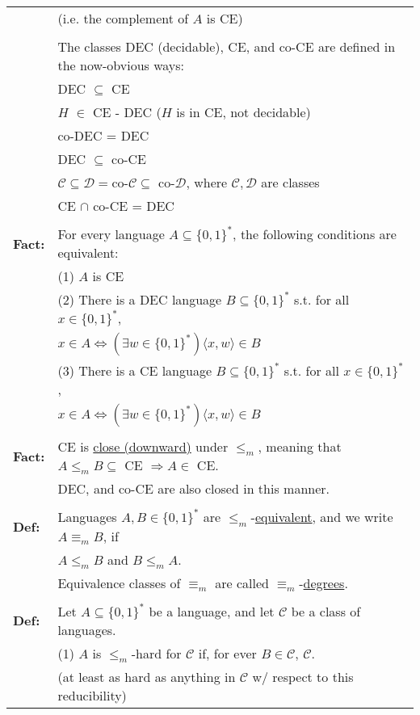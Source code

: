 \documentclass[11pt]{article}
\begin{document}
\begin{longtable}{ll}
& (i.e. the complement of $A$ is CE) \\
\\
& The classes DEC (decidable), CE, and co-CE are defined in the now-obvious ways: \\
& DEC $\subseteq$ CE \\
& $H$ $\in$ CE - DEC ($H$ is in CE, not decidable) \\
& co-DEC = DEC \\
& DEC $\subseteq$ co-CE \\
& $\mathcal{C} \subseteq \mathcal{D} = $co-$\mathcal{C} \subseteq$ co-$\mathcal{D}$, where $\mathcal{C},\mathcal{D}$ are classes \\
& CE $\cap$ co-CE = DEC \\
\\
{\bf Fact:} & For every language $A\subseteq\{0,1\}^*$, the following conditions are equivalent: \\
& (1) $A$ is CE \\
& (2) There is a DEC language $B\subseteq\{0,1\}^*$ s.t. for all $x\in\{0,1\}^*$, \\
& $x\in A \Leftrightarrow (\exists w \in \{0,1\}^*)\langle x,w \rangle \in B$ \\
& (3) There is a CE language $B\subseteq\{0,1\}^*$ s.t. for all $x\in\{0,1\}^*$, \\
& $x\in A \Leftrightarrow (\exists w \in \{0,1\}^*)\langle x,w \rangle \in B$ \\
\\
{\bf Fact:} & CE is \underline{close (downward)} under $\leqslant_m$, meaning that $A \leqslant_m B \subseteq$ CE $\Rightarrow A \in$ CE. \\
& DEC, and co-CE are also closed in this manner. \\
\\
{\bf Def:} & Languages $A,B\in\{0,1\}^*$ are $\leqslant_m$-\underline{equivalent}, and we write $A \equiv_m B$, if \\
& $A \leqslant_m B$ and $B \leqslant_m A$. \\
& Equivalence classes of $\equiv_m$ are called $\equiv_m$-\underline{degrees}. \\
\\
{\bf Def:} & Let $A \subseteq \{0,1\}^*$ be a language, and let $\mathcal{C}$ be a class of languages. \\  
& (1) $A$ is $\leqslant_m$-hard for $\mathcal{C}$ if, for ever $B\in\mathcal{C}$, $\mathcal{C}$. \\
& (at least as hard as anything in $\mathcal{C}$ w/ respect to this reducibility) \\

\end{longtable}
\end{document}
